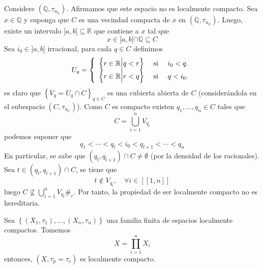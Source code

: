 \documentclass[12pt]{report}
\theoremstyle{largebreak}
\newcommand\contradiction{\ensuremath{\#_c}}
\newcommand{\natint}[1]{\ensuremath{\left[\!\left[#1\right]\!\right]}}
\begin{document}
    \begin{exa}
        Considere $(\mathbb{Q},\tau_{ u_{\mathbb{Q}}})$. Afirmamos que este espacio no es localmente compacto. Sea $x\in\mathbb{Q}$ y suponga que $C$ es una vecindad compacta de $x$ en $(\mathbb{Q},\tau_{ u_{\mathbb{Q}}})$. Luego, existe un intervalo $]a,b[\subseteq\mathbb{R}$ que contiene a $x$ tal que
        \begin{equation*}
            x\in ]a,b[\cap\mathbb{Q}\subseteq C
        \end{equation*}
        Sea $i_0\in]a,b[$ irracional, para cada $q\in C$ definimos
        \begin{equation*}
            U_q=\left\{
                \begin{array}{lcr}
                    \left\{r\in\mathbb{R}\Big|q<r \right\} & \textup{ si } & i_0<q.\\
                    \left\{r\in\mathbb{R}\Big|r<q \right\} & \textup{ si } & q<i_0.\\
                \end{array}
            \right.
        \end{equation*}
        es claro que $\left\{V_q=U_q\cap C \right\}_{ q\in C}$ es una cubierta abierta de $C$ (considerándola en el subespacio $(C,\tau_{u_C})$). Como $C$ es compacto existen $q_1,...,q_n\in C$ tales que
        \begin{equation*}
            C=\bigcup_{ i=1}^n V_{ q_i}
        \end{equation*}
        podemos suponer que
        \begin{equation*}
            q_1<\cdots <q_l<i_0<q_{l+1}<\cdots<q_n
        \end{equation*}
        En particular, se sabe que $(q_l,q_{l+1})\cap C\neq\emptyset$ (por la densidad de los racionales). Sea $t\in (q_l,q_{l+1})\cap C$, se tiene que
        \begin{equation*}
            t\notin V_{ q_i},\quad\forall i\in\natint{1,n}
        \end{equation*}
        luego $C\nsubseteq \bigcup_{ i=1}^n V_{ q_i}$\contradiction. Por tanto, la propiedad de ser localmente compacto no es hereditaria.
    \end{exa}

    \begin{propo}
        Sea $\left\{(X_1,\tau_1),...,(X_n,\tau_n) \right\}$ una familia finita de espacios localmente compactos. Tomemos
        \begin{equation*}
            X=\prod_{ i=1}^n X_i
        \end{equation*}
        entonces, $(X,\tau_p=\tau_c)$ es localmente compacto.
    \end{propo}
\end{document}
